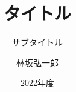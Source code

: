 \documentclass[12pt,dvipdfmx,aspectratio=169]{beamer}
\title{タイトル}
\subtitle{サブタイトル}
\author{林坂弘一郎}
\date{2022年度}
\institute[神戸学院大学]{神戸学院大学 経営学部}
\theoremstyle{example}
\begin{document}
\frame{\titlepage}
\section[Outline]{}
\frame{\tableofcontents}
% 
\end{document}
